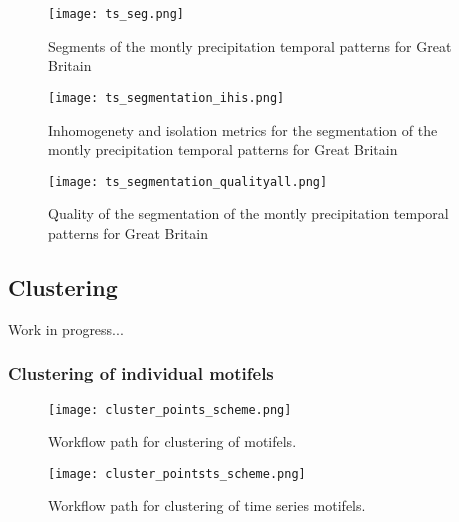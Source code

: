 
\begin{wrapfigure}{r}{0.5\textwidth}
	\centering
	\texttt{[image: ts\_seg.png]}
	\caption{Segments of the montly precipitation temporal patterns for Great Britain}
	\label{FIG:SEGTS1}
\end{wrapfigure}

\begin{wrapfigure}{r}{0.5\textwidth}
\end{wrapfigure}

\begin{figure}[H]
	\centering
	\texttt{[image: ts\_segmentation\_ihis.png]}
	\caption{Inhomogenety and isolation metrics for the segmentation of the montly precipitation temporal patterns for Great Britain}
	\label{FIG:SEGTS2}
\end{figure}

\begin{figure}[H]
	\centering
	\texttt{[image: ts\_segmentation\_qualityall.png]}
	\caption{Quality of the segmentation of the montly precipitation temporal patterns for Great Britain}
	\label{FIG:SEGTS3}
\end{figure}


\FloatBarrier

\subsection{Clustering}
Work in progress...

\subsubsection{Clustering of individual motifels}

\begin{figure}[H]
	\centering
	\texttt{[image: cluster\_points\_scheme.png]}
	\caption{Workflow path for clustering of motifels.}
	\label{FIG:CLUSTER_POINTS}
\end{figure}

\begin{figure}[H]
	\centering
	\texttt{[image: cluster\_pointsts\_scheme.png]}
	\caption{Workflow path for clustering of time series motifels.}
	\label{FIG:CLUSTER_POINTSTS}
\end{figure}

